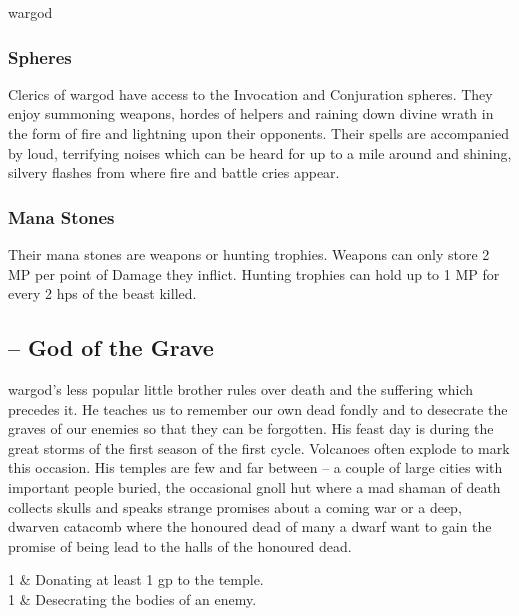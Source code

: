 \begin{multicols}{2}
\begin{xpchart}{\Gls{wargod}}
\end{xpchart}

\subsubsection{Spheres}

Clerics of \Gls{wargod} have access to the Invocation and Conjuration spheres.
They enjoy summoning weapons, hordes of helpers and raining down divine wrath in the form of fire and lightning upon their opponents.
Their spells are accompanied by loud, terrifying noises which can be heard for up to a mile around and shining, silvery flashes from where fire and battle cries appear.

\subsubsection{Mana Stones}

Their mana stones are weapons or hunting trophies.
Weapons can only store 2 MP per point of Damage they inflict.
Hunting trophies can hold up to 1 MP for every 2 \glspl{hp} of the beast killed.

\subsection{ -- God of the Grave}

\noindent \Gls{wargod}'s less popular little brother rules over death and the suffering which precedes it.
He teaches us to remember our own dead fondly and to desecrate the graves of our enemies so that they can be forgotten.
His feast day is during the great storms of the first season of the first cycle.
Volcanoes often explode to mark this occasion.
His temples are few and far between -- a couple of large cities with important people buried, the occasional gnoll hut where a mad shaman of death collects skulls and speaks strange promises about a coming war or a deep, dwarven catacomb where the honoured dead of many a dwarf want to gain the promise of being lead to the halls of the honoured dead.

\begin{xpchart}{}

	1 & Donating at least 1 gp to the temple. \\

	1 & Desecrating the bodies of an enemy. \\


\end{xpchart}
\end{multicols}
